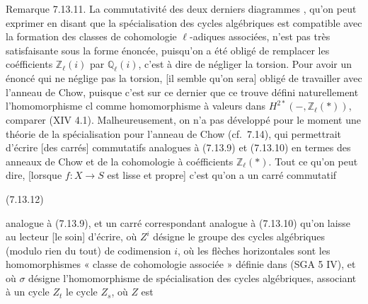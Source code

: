 \documentclass[11pt,a4paper]{article}
\begin{document}
 Remarque 7.13.11. La commutativité des deux derniers
diagrammes , qu'on peut exprimer en disant que la
spécialisation des cycles algébriques est compatible avec la formation des
classes de cohomologie $\ell$-adiques associées, n'est pas très satisfaisante
sous la forme énoncée, puisqu'on \struck{\ill{}} a été obligé de remplacer les
coéfficients $\mathbb{Z}_{\ell}(i)$ par $\mathbb{Q}_{\ell}(i)$, c'est à dire de
négliger la torsion.  Pour avoir un
énoncé qui ne néglige pas la torsion, [il semble qu'on sera] 
obligé de travailler avec l'anneau de Chow, puisque c'est sur ce dernier que ce
trouve défini naturellement l'homomorphisme $\mathrm{cl}$ comme homomorphisme à
valeurs dans $H^{2*}(-, \mathbb{Z}_{\ell}(*))$, \struck{\ill{}} \struck{\ill{}}
comparer (XIV 4.1). 
Malheureusement, on n'a pas développé pour le moment une théorie de la
spécialisation pour l'anneau de Chow \struck{\ill{}} (cf.\ 7.14), qui
permettrait d'écrire [des carrés]  commutatifs analogues à
(7.13.9) et (7.13.10) en termes des anneaux de Chow et de la cohomologie à
coéfficients $\mathbb{Z}_{\ell}(*)$. Tout ce qu'on peut dire, [lorsque
$f \colon X \to S$ est lisse et propre] c'est qu'on a un carré commutatif

(7.13.12)



\struck{\ill{}} analogue à (7.13.9), et un carré correspondant analogue à
(7.13.10) qu'on laisse au lecteur [le soin] d'écrire, où $Z^{i}$
désigne le groupe des cycles algébriques (modulo rien du tout) de codimension
$i$, \struck{\ill{}} où les flèches horizontales sont les homomorphismes
« classe de cohomologie associée » définie dans (SGA 5 IV), et où $\sigma$
désigne l'homomorphisme de spécialisation des cycles algébriques, associant à un
cycle $Z_{t}$ le cycle $Z_{s}$, où $Z$ est
\end{document}
